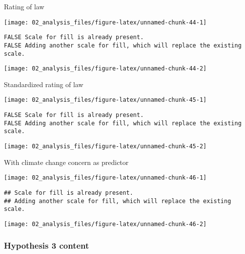 \documentclass[
]{article}
\begin{document}
Rating of law

\begin{center}\texttt{[image: 02\_analysis\_files/figure-latex/unnamed-chunk-44-1]} \end{center}

\begin{verbatim}
FALSE Scale for fill is already present.
FALSE Adding another scale for fill, which will replace the existing scale.
\end{verbatim}

\begin{center}\texttt{[image: 02\_analysis\_files/figure-latex/unnamed-chunk-44-2]} \end{center}

Standardized rating of law

\begin{center}\texttt{[image: 02\_analysis\_files/figure-latex/unnamed-chunk-45-1]} \end{center}

\begin{verbatim}
FALSE Scale for fill is already present.
FALSE Adding another scale for fill, which will replace the existing scale.
\end{verbatim}

\begin{center}\texttt{[image: 02\_analysis\_files/figure-latex/unnamed-chunk-45-2]} \end{center}

With climate change concern as predictor

\begin{center}\texttt{[image: 02\_analysis\_files/figure-latex/unnamed-chunk-46-1]} \end{center}

\begin{verbatim}
## Scale for fill is already present.
## Adding another scale for fill, which will replace the existing scale.
\end{verbatim}

\begin{center}\texttt{[image: 02\_analysis\_files/figure-latex/unnamed-chunk-46-2]} \end{center}

\hypertarget{hypothesis-3-content}{%
\subsubsection{Hypothesis 3 content}\label{hypothesis-3-content}}
\end{document}
